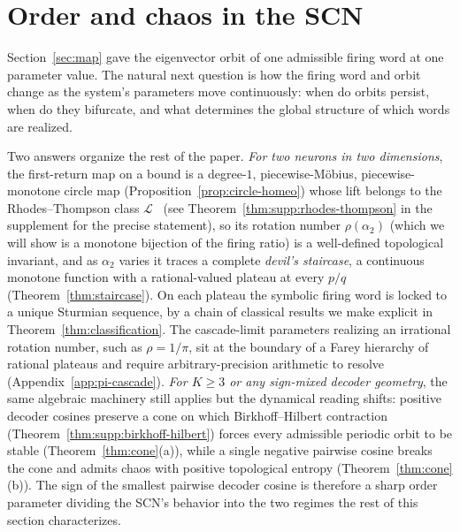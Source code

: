\documentclass[12pt]{article}
\begin{document}
\section{Order and chaos in the SCN}\label{sec:bifurcation}

Section~\ref{sec:map} gave the eigenvector orbit of one admissible firing word at one parameter value. The natural next question is how the firing word and orbit change as the system's parameters move continuously: when do orbits persist, when do they bifurcate, and what determines the global structure of which words are realized.

Two answers organize the rest of the paper. \emph{For two neurons in two dimensions}, the first-return map on a bound is a degree-$1$, piecewise-M\"obius, piecewise-monotone circle map (Proposition~\ref{prop:circle-homeo}) whose lift belongs to the Rhodes--Thompson class $\mathcal{L}$~\citep{rhodes1991topologies,alseda2000combinatorial} (see Theorem~\ref{thm:supp:rhodes-thompson} in the supplement for the precise statement), so its rotation number $\rho(\alpha_2)$ (which we will show is a monotone bijection of the firing ratio) is a well-defined topological invariant, and as $\alpha_2$ varies it traces a complete \emph{devil's staircase}, a continuous monotone function with a rational-valued plateau at every $p/q$ (Theorem~\ref{thm:staircase}). On each plateau the symbolic firing word is locked to a unique Sturmian sequence, by a chain of classical results we make explicit in Theorem~\ref{thm:classification}. The cascade-limit parameters realizing an irrational rotation number, such as $\rho=1/\pi$, sit at the boundary of a Farey hierarchy of rational plateaus and require arbitrary-precision arithmetic to resolve (Appendix~\ref{app:pi-cascade}). \emph{For $K\geq 3$ or any sign-mixed decoder geometry}, the same algebraic machinery still applies but the dynamical reading shifts: positive decoder cosines preserve a cone on which Birkhoff--Hilbert contraction (Theorem~\ref{thm:supp:birkhoff-hilbert}) forces every admissible periodic orbit to be stable (Theorem~\ref{thm:cone}(a)), while a single negative pairwise cosine breaks the cone and admits chaos with positive topological entropy (Theorem~\ref{thm:cone}(b)). The sign of the smallest pairwise decoder cosine is therefore a sharp order parameter dividing the SCN's behavior into the two regimes the rest of this section characterizes.
\end{document}
